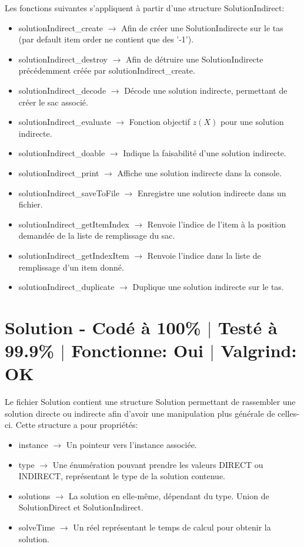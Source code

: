 \documentclass{EPUProjetPeiP}
\newcommand{\comp}[5]{
	\section[#1]{#1 {\small - Codé à #2\% $\vert$ Testé à #3\% $\vert$ Fonctionne: #4 $\vert$ Valgrind: #5}}
}
\begin{document}
Les fonctions suivantes s'appliquent à partir d'une structure SolutionIndirect:
\begin{itemize}
	\item solutionIndirect\_create $\longrightarrow$ Afin de créer une SolutionIndirecte sur le tas (par default item order ne contient que des '-1').
	\item solutionIndirect\_destroy $\longrightarrow$ Afin de détruire une SolutionIndirecte précédemment créée par solutionIndirect\_create.
	\item solutionIndirect\_decode $\longrightarrow$ Décode une solution indirecte, permettant de créer le sac associé.
	\item solutionIndirect\_evaluate $\longrightarrow$ Fonction objectif $z(X)$ pour une solution indirecte.
	\item solutionIndirect\_doable $\longrightarrow$ Indique la faisabilité d'une solution indirecte.
	\item solutionIndirect\_print $\longrightarrow$ Affiche une solution indirecte dans la console.
	\item solutionIndirect\_saveToFile $\longrightarrow$ Enregistre une solution indirecte dans un fichier.
	\item solutionIndirect\_getItemIndex $\longrightarrow$ Renvoie l'indice de l'item à la position demandée de la liste de remplissage du sac.
	\item solutionIndirect\_getIndexItem $\longrightarrow$ Renvoie l'indice dans la liste de remplissage d'un item donné.
	\item solutionIndirect\_duplicate $\longrightarrow$ Duplique une solution indirecte sur le tas.
\end{itemize}

\comp{Solution}{100}{99.9}{Oui}{OK}
Le fichier Solution contient une structure Solution permettant de rassembler une solution directe ou indirecte afin d'avoir une manipulation plus générale de celles-ci. Cette structure a pour propriétés:
\begin{itemize}
	\item instance $\longrightarrow$ Un pointeur vers l'instance associée.
	\item type $\longrightarrow$ Une énumération pouvant prendre les valeurs DIRECT ou INDIRECT, représentant le type de la solution contenue.
	\item solutions $\longrightarrow$ La solution en elle-même, dépendant du type. Union de SolutionDirect et SolutionIndirect.
	\item solveTime $\longrightarrow$ Un réel représentant le temps de calcul pour obtenir la solution.\\
\end{itemize}
\end{document}

